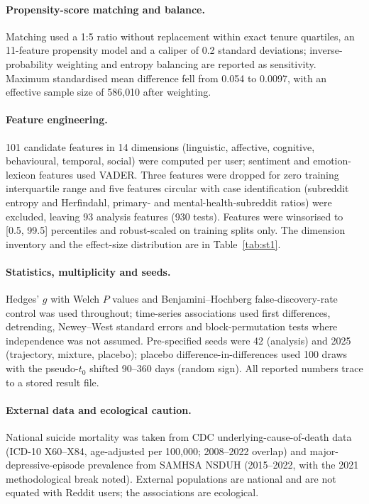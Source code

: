 \documentclass[11pt]{article}
\begin{document}
\paragraph*{Propensity-score matching and balance.}
Matching used a 1:5 ratio without replacement within exact tenure quartiles, an 11-feature
propensity model and a caliper of 0.2 standard deviations; inverse-probability weighting and
entropy balancing are reported as sensitivity. Maximum standardised mean difference fell from
0.054 to 0.0097, with an effective sample size of 586{,}010 after weighting.

\paragraph*{Feature engineering.}
101 candidate features in 14 dimensions (linguistic, affective, cognitive,
behavioural, temporal, social) were computed per user; sentiment and emotion-lexicon features
used VADER. Three features were dropped for zero training interquartile range and five features
circular with case identification (subreddit entropy and Herfindahl, primary- and
mental-health-subreddit ratios) were excluded, leaving 93 analysis features (930 tests).
Features were winsorised to [0.5, 99.5] percentiles and robust-scaled on training splits only.
The dimension inventory and the effect-size distribution are in Table~\ref{tab:st1}.

\paragraph*{Statistics, multiplicity and seeds.}
Hedges' $g$ with Welch $P$ values and Benjamini--Hochberg false-discovery-rate control was used
throughout; time-series associations used first differences, detrending, Newey--West standard
errors and block-permutation tests where independence was not assumed. Pre-specified seeds were
42 (analysis) and 2025 (trajectory, mixture, placebo); placebo difference-in-differences used
100 draws with the pseudo-$t_0$ shifted 90--360 days (random sign). All reported numbers trace
to a stored result file.

\paragraph*{External data and ecological caution.}
National suicide mortality was taken from CDC underlying-cause-of-death data (ICD-10 X60--X84,
age-adjusted per 100{,}000; 2008--2022 overlap) and major-depressive-episode prevalence from
SAMHSA NSDUH (2015--2022, with the 2021 methodological break noted). External populations are
national and are not equated with Reddit users; the associations are ecological.
\end{document}
